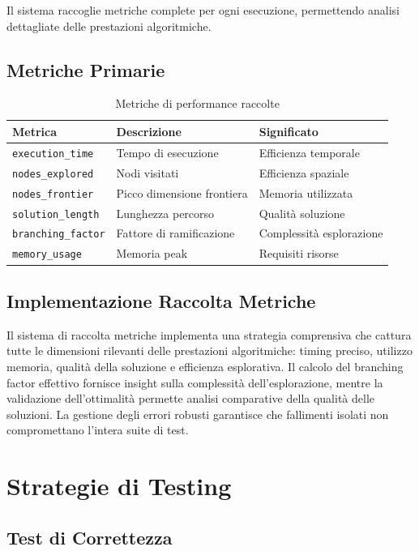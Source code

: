 \documentclass[12pt,a4paper]{report}
\theoremstyle{definition}
\begin{document}
Il sistema raccoglie metriche complete per ogni esecuzione, permettendo analisi dettagliate delle prestazioni algoritmiche.

\subsection{Metriche Primarie}

\begin{table}[H]
\centering
\caption{Metriche di performance raccolte}
\begin{tabular}{|l|l|l|}
\hline
\textbf{Metrica} & \textbf{Descrizione} & \textbf{Significato} \\
\hline
\texttt{execution\_time} & Tempo di esecuzione & Efficienza temporale \\
\texttt{nodes\_explored} & Nodi visitati & Efficienza spaziale \\
\texttt{nodes\_frontier} & Picco dimensione frontiera & Memoria utilizzata \\
\texttt{solution\_length} & Lunghezza percorso & Qualità soluzione \\
\texttt{branching\_factor} & Fattore di ramificazione & Complessità esplorazione \\
\texttt{memory\_usage} & Memoria peak & Requisiti risorse \\
\hline
\end{tabular}
\end{table}

\subsection{Implementazione Raccolta Metriche}

Il sistema di raccolta metriche implementa una strategia comprensiva che cattura tutte le dimensioni rilevanti delle prestazioni algoritmiche: timing preciso, utilizzo memoria, qualità della soluzione e efficienza esplorativa. Il calcolo del branching factor effettivo fornisce insight sulla complessità dell'esplorazione, mentre la validazione dell'ottimalità permette analisi comparative della qualità delle soluzioni. La gestione degli errori robusti garantisce che fallimenti isolati non compromettano l'intera suite di test.

\section{Strategie di Testing}

\subsection{Test di Correttezza}
\end{document}
